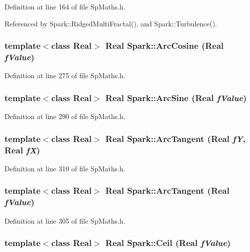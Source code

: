 Definition at line 164 of file Sp\-Maths.h.

Referenced by Spark::Ridged\-Multi\-Fractal(), and Spark::Turbulence().
\subsubsection{\setlength{\rightskip}{0pt plus 5cm}template$<$class Real$>$ Real Spark::Arc\-Cosine (Real {\em f\-Value})}\label{namespaceSpark_a61}


Definition at line 275 of file Sp\-Maths.h.
\subsubsection{\setlength{\rightskip}{0pt plus 5cm}template$<$class Real$>$ Real Spark::Arc\-Sine (Real {\em f\-Value})}\label{namespaceSpark_a62}


Definition at line 290 of file Sp\-Maths.h.
\subsubsection{\setlength{\rightskip}{0pt plus 5cm}template$<$class Real$>$ Real Spark::Arc\-Tangent (Real {\em f\-Y}, Real {\em f\-X})}\label{namespaceSpark_a64}


Definition at line 310 of file Sp\-Maths.h.
\subsubsection{\setlength{\rightskip}{0pt plus 5cm}template$<$class Real$>$ Real Spark::Arc\-Tangent (Real {\em f\-Value})}\label{namespaceSpark_a63}


Definition at line 305 of file Sp\-Maths.h.
\subsubsection{\setlength{\rightskip}{0pt plus 5cm}template$<$class Real$>$ Real Spark::Ceil (Real {\em f\-Value})}\label{namespaceSpark_a41}


